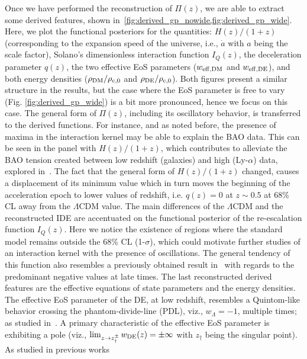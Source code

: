 \documentclass[twocolumn,a4paper,reprint,amssymb,aps,prd,groupedaddress,superscriptaddress,nofootinbib]{revtex4-2}
\begin{document}
Once we have performed the reconstruction of $\Pi(z)$, we are able to extract some derived features,
shown in~\cref{fig:derived_gp_nowide,fig:derived_gp_wide}.
%
Here, we plot the functional posteriors for the quantities: $H(z)/(1+z)$ (corresponding to the expansion
speed of the universe, i.e., $\dot a$ with $a$ being the scale factor), Solano’s dimensionless
interaction function $I_Q(z)$, the deceleration parameter $q(z)$, the two effective EoS parameters
($w_{\rm eff, \rm DM}$ and $w_{\rm eff, \rm DE}$), and both energy densities ($\rho_{\rm DM}/\rho_{\rm c,0}$
and $\rho_{\rm DE}/\rho_{\rm c,0}$). Both figures present a similar structure in the results, but the
case where the EoS parameter is free to vary (Fig. \ref{fig:derived_gp_wide}) is a bit more pronounced,
hence we focus on this case.
The general form of $\Pi(z)$, including its oscillatory behavior,  is transferred to the derived
functions. For instance, and as noted  before, the presence of maxima in the interaction kernel
may be able to explain the BAO data.
This can be seen in the panel with $H(z)/(1+z)$, which contributes to
alleviate the BAO tension created between low redshift (galaxies) and high (Ly-$\alpha$) data,
explored in~\cite{aubourg2015cosmological, Akarsu:2019hmw}.
The fact that the general form of $H(z)/(1+z)$ changed, causes a displacement of its minimum
value which in turn moves the beginning of the acceleration epoch to lower values of redshift, i.e.
$q(z)=0$ at $z\sim 0.5$ at 68\% CL away from the $\Lambda$CDM value.
The main differences of the $\Lambda$CDM and the reconstructed IDE are accentuated
on the functional posterior of the re-escalation function $I_Q(z)$. Here we notice the
existence of regions where the standard model remains outside the 68\% CL (1-$\sigma$),
which could motivate further studies of an interaction kernel with the presence of oscillations.
The general tendency of this function also resembles a previously obtained result
in~\cite{Bonilla:2021dql} with regards to the predominant negative values at late times.
%
The last reconstructed derived features are the effective equations of state parameters
and the energy densities. The effective EoS parameter of the DE, at low redshift, resembles a Quintom-like
behavior crossing the phantom-divide-line (PDL), viz., $w_\Lambda =-1$, multiple times; as studied in~\cite{Vazquez:2023kyx}.
%
A primary characteristic of the effective EoS parameter is
exhibiting a pole (viz., ${\lim_{z\to z_\dagger^{\pm}}w_{\rm DE}(z)=\pm\infty}$ with $z_\dagger$
being the singular point).
As studied in previous works~\cite{Akarsu:2020pka, Akarsu:2021fol, Escamilla:2021uoj, Ozulker:2022slu}
\end{document}

